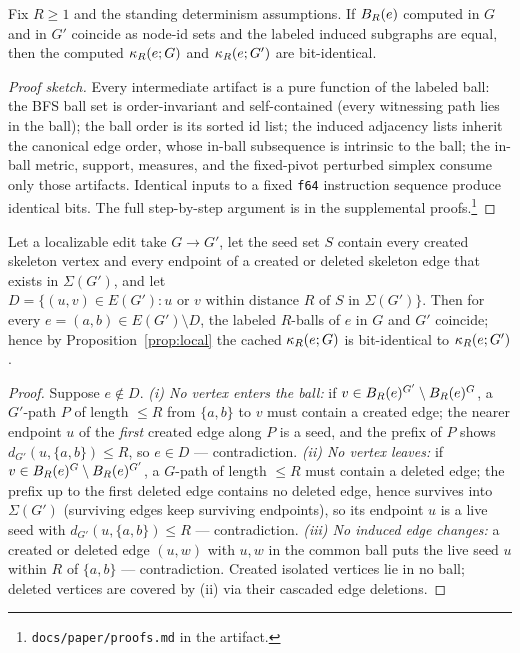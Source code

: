 \begin{proposition}\label{prop:local}
Fix $R \ge 1$ and the standing determinism assumptions. If
$B_{R}(e)$ computed in $G$ and in $G'$ coincide as node-id sets and the
labeled induced subgraphs are equal, then the computed $\kappa_R(e;G)$ and
$\kappa_R(e;G')$ are bit-identical.
\end{proposition}

\begin{proof}[Proof sketch]
Every intermediate artifact is a pure function of the labeled ball: the BFS
ball set is order-invariant and self-contained (every witnessing path lies
in the ball); the ball order is its sorted id list; the induced adjacency
lists inherit the canonical edge order, whose in-ball subsequence is
intrinsic to the ball; the in-ball metric, support, measures, and the
fixed-pivot perturbed simplex consume only those artifacts. Identical inputs
to a fixed \texttt{f64} instruction sequence produce identical bits. The
full step-by-step argument is in the supplemental
proofs.\footnote{\texttt{docs/paper/proofs.md} in the artifact.}
\end{proof}

\begin{lemma}\label{lem:cover}
Let a localizable edit take $G \to G'$, let the seed set $S$ contain every
created skeleton vertex and every endpoint of a created or deleted skeleton
edge that exists in $\Sigma(G')$, and let
$D = \{ (u,v) \in E(G') : u \text{ or } v \text{ within distance } R
\text{ of } S \text{ in } \Sigma(G') \}$. Then for every
$e = (a,b) \in E(G') \setminus D$, the labeled $R$-balls of $e$ in $G$ and
$G'$ coincide; hence by Proposition~\ref{prop:local} the cached $\kappa_R(e;G)$
is bit-identical to $\kappa_R(e;G')$.
\end{lemma}

\begin{proof}
Suppose $e \notin D$. \emph{(i) No vertex enters the ball:} if
$v \in B_{R}(e)^{G'} \setminus B_{R}(e)^{G}$, a $G'$-path $P$ of
length $\le R$ from $\{a,b\}$ to $v$ must contain a created edge; the
nearer endpoint $u$ of the \emph{first} created edge along $P$ is a seed,
and the prefix of $P$ shows $d_{G'}(u,\{a,b\}) \le R$, so $e \in D$ ---
contradiction. \emph{(ii) No vertex leaves:} if
$v \in B_{R}(e)^{G} \setminus B_{R}(e)^{G'}$, a $G$-path of length
$\le R$ must contain a deleted edge; the prefix up to the first deleted
edge contains no deleted edge, hence survives into $\Sigma(G')$ (surviving
edges keep surviving endpoints), so its endpoint $u$ is a live seed with
$d_{G'}(u,\{a,b\}) \le R$ --- contradiction. \emph{(iii) No induced edge
changes:} a created or deleted edge $(u,w)$ with $u,w$ in the common ball
puts the live seed $u$ within $R$ of $\{a,b\}$ --- contradiction. Created
isolated vertices lie in no ball; deleted vertices are covered by (ii) via
their cascaded edge deletions.
\end{proof}

